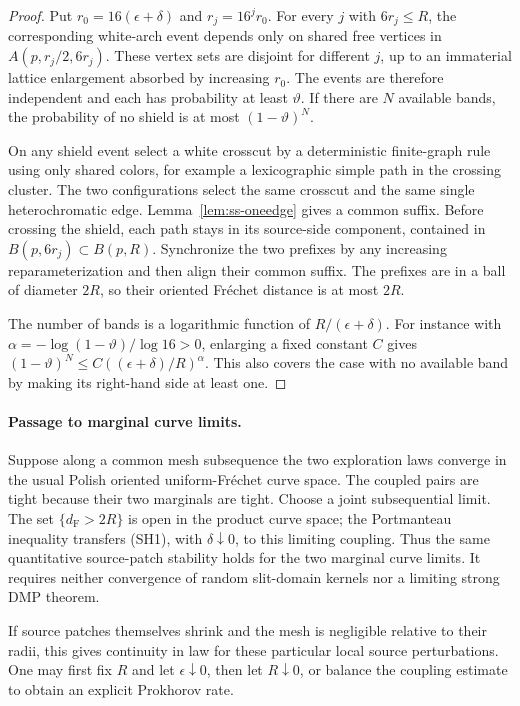 \documentclass[11pt]{article}
\theoremstyle{definition}\newtheorem{definition}[theorem]{Definition}
\theoremstyle{remark}\newtheorem{remark}[theorem]{Remark}
\begin{document}
\begin{proof}
Put $r_0=16(\epsilon+\delta)$ and $r_j=16^j r_0$.
For every $j$ with $6r_j\leq R$, the corresponding white-arch event
depends only on shared free vertices in
$A(p,r_j/2,6r_j)$. These vertex sets are disjoint for different $j$,
up to an immaterial lattice enlargement absorbed by increasing $r_0$.
The events are therefore independent and each has probability at least
$\vartheta$. If there are $N$ available bands, the probability of no
shield is at most $(1-\vartheta)^N$.

On any shield event select a white crosscut by a deterministic finite-graph
rule using only shared colors, for example a lexicographic simple path in
the crossing cluster. The two configurations select the same crosscut and
the same single heterochromatic edge. Lemma~\ref{lem:ss-oneedge} gives a
common suffix. Before crossing the shield, each path stays in its
source-side component, contained in $B(p,6r_j)\subset B(p,R)$.
Synchronize the two prefixes by any increasing reparameterization and then
align their common suffix. The prefixes are in a ball of diameter $2R$,
so their oriented Fr\'echet distance is at most $2R$.

The number of bands is a logarithmic function of $R/(\epsilon+\delta)$.
For instance with
$\alpha=-\log(1-\vartheta)/\log16>0$, enlarging a fixed constant $C$
gives $(1-\vartheta)^N\leq
C((\epsilon+\delta)/R)^\alpha$. This also covers the case with no
available band by making its right-hand side at least one.
\end{proof}

\paragraph{Passage to marginal curve limits.}
Suppose along a common mesh subsequence the two exploration laws converge
in the usual Polish oriented uniform-Fr\'echet curve space. The coupled
pairs are tight because their two marginals are tight. Choose a joint
subsequential limit. The set
$\{d_{\mathrm F}>2R\}$ is open in the product curve space; the Portmanteau
inequality transfers (SH1), with $\delta\downarrow0$, to this limiting
coupling. Thus the same quantitative source-patch stability holds for the
two marginal curve limits. It requires neither convergence of random
slit-domain kernels nor a limiting strong DMP theorem.

If source patches themselves shrink and the mesh is negligible relative
to their radii, this gives continuity in law for these particular local
source perturbations. One may first fix $R$ and let $\epsilon\downarrow0$,
then let $R\downarrow0$, or balance the coupling estimate to obtain an
explicit Prokhorov rate.
\end{document}
